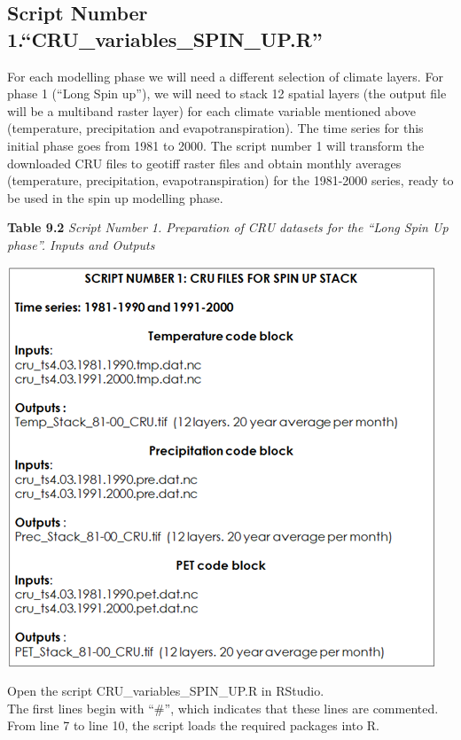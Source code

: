 \documentclass[
  10pt,
  b5paper,
]{book}
\begin{document}
\hypertarget{script-number-1.cru_variables_spin_up.r}{%
\subsection{Script Number 1.``CRU\_variables\_SPIN\_UP.R''}\label{script-number-1.cru_variables_spin_up.r}}

For each modelling phase we will need a different selection of climate layers. For phase 1 (``Long Spin up''), we will need to stack 12 spatial layers (the output file will be a multiband raster layer) for each climate variable mentioned above (temperature, precipitation and evapotranspiration). The time series for this initial phase goes from 1981 to 2000. The script number 1 will transform the downloaded CRU files to geotiff raster files and obtain monthly averages (temperature, precipitation, evapotranspiration) for the 1981-2000 series, ready to be used in the spin up modelling phase.

\textbf{Table 9.2} \emph{Script Number 1. Preparation of CRU datasets for the ``Long Spin Up phase''. Inputs and Outputs}

\includegraphics{tables/Table_9.1.png}

Open the script CRU\_variables\_SPIN\_UP.R in RStudio.\\
The first lines begin with ``\#'', which indicates that these lines are commented. From line 7 to line 10, the script loads the required packages into R.
\end{document}
